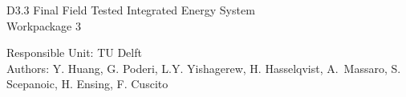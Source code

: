 
\begin{titlepage}

  \begin{center}
	
	\vspace*{-1.5cm}
    {\fontsize{36}{32}\selectfont\color{RedOrange}
        D3.3 Final Field Tested Integrated Energy System 
        \\ \vspace{.5cm}
		Workpackage 3
    }
	
	 \vfill
	 
    {\fontsize{18}{22}\color{RedOrange}
      Responsible Unit:  TU Delft
      \\ \vspace{.3cm}
      Authors: Y. Huang, G. Poderi, L.Y. Yishagerew, H. Hasselqvist, A.~Massaro, S. Scepanoic, H. Ensing, F. Cuscito
    }

  \end{center}

\end{titlepage}
